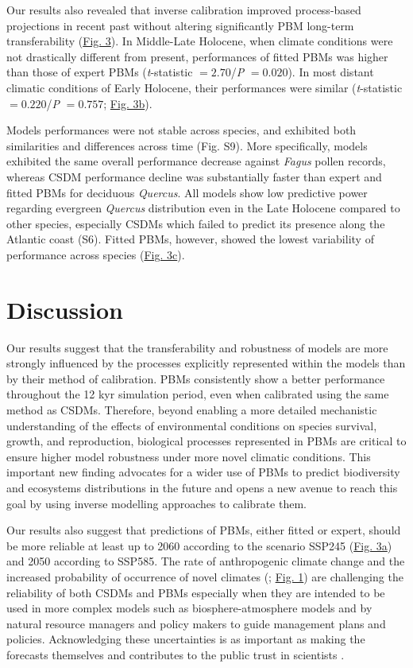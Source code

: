 \documentclass[9pt,twocolumn,twoside]{pnas-new}
\begin{document}
Our results also revealed that inverse calibration improved process-based projections in recent past
without altering significantly PBM long-term transferability (\hyperref[fig:pastperformance]{Fig. 3}). In Middle-Late Holocene, when climate conditions were not drastically different from present, performances of fitted PBMs was higher than those of expert PBMs (\emph{t}-statistic $=2.70$/\emph{P} $=0.020$). In most distant climatic conditions of Early Holocene, their performances were similar (\emph{t}-statistic $=0.220$/\emph{P} $=0.757$; \hyperref[fig:pastperformance]{Fig. 3b}). 

Models performances were not stable across species, and exhibited both similarities and differences across time (Fig. S9). More specifically, models exhibited the same overall performance decrease against \emph{Fagus} pollen records, whereas CSDM performance decline was substantially faster than expert and fitted PBMs for deciduous \emph{Quercus}. All models show low predictive power regarding evergreen \emph{Quercus} distribution even in the Late Holocene compared to other species, especially CSDMs which failed to predict its presence along the Atlantic coast (S6). Fitted PBMs, however, showed the lowest variability of performance across species (\hyperref[fig:pastperformance]{Fig. 3c}).


\section*{Discussion}

Our results suggest that the transferability and robustness of models are more strongly influenced by the processes explicitly represented within the models than by their method of calibration. PBMs consistently show a better performance throughout the 12 kyr simulation period, even when calibrated using the same method as CSDMs. Therefore, beyond enabling a more detailed mechanistic understanding of the effects of environmental conditions on species survival, growth, and reproduction, biological processes represented in PBMs are critical to ensure higher model robustness under more novel climatic conditions. This important new finding advocates for a wider use of PBMs to predict biodiversity and ecosystems distributions in the future and opens a new avenue to reach this goal by using inverse modelling approaches to calibrate them.

Our results also suggest that predictions of PBMs, either fitted or expert, should be more reliable at least up to 2060 according to the scenario SSP245 (\hyperref[fig:pastperformance]{Fig. 3a}) and 2050 according to SSP585. The rate of anthropogenic climate change and the increased probability of occurrence of novel climates (\cite{Williams2007}; \hyperref[fig:climaticdissimilarity]{Fig. 1}) are challenging the reliability of both CSDMs and PBMs especially when they are intended to be used in more complex models such as biosphere-atmosphere models and by natural resource managers and policy makers to guide management plans and policies. Acknowledging these uncertainties is as important as making the forecasts themselves \cite{Beale2012} and contributes to the public trust in scientists \cite{Berkhout2010}.
\end{document}
